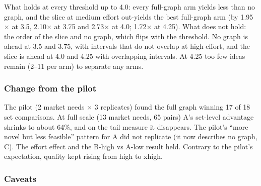 What holds at every threshold up to 4.0: every full-graph arm yields less than no graph, and the slice at medium effort out-yields the best full-graph arm (by 1.95$\times$ at 3.5, 2.10$\times$ at 3.75 and 2.73$\times$ at 4.0; 1.72$\times$ at 4.25). What does not hold: the order of the slice and no graph, which flips with the threshold. No graph is ahead at 3.5 and 3.75, with intervals that do not overlap at high effort, and the slice is ahead at 4.0 and 4.25 with overlapping intervals. At 4.25 too few ideas remain (2--11 per arm) to separate any arms.

\hypertarget{change-from-the-pilot}{%
\subsubsection{Change from the pilot}\label{change-from-the-pilot}}

The pilot (2 market needs $\times$ 3 replicates) found the full graph winning 17 of 18 set comparisons. At full scale (13 market needs, 65 pairs) A's set-level advantage shrinks to about 64\%, and on the tail measure it disappears. The pilot's ``more novel but less feasible'' pattern for A did not replicate (it now describes no graph, C). The effort effect and the B-high vs A-low result held. Contrary to the pilot's expectation, quality kept rising from high to xhigh.

\hypertarget{caveats}{%
\subsubsection{Caveats}\label{caveats}}

